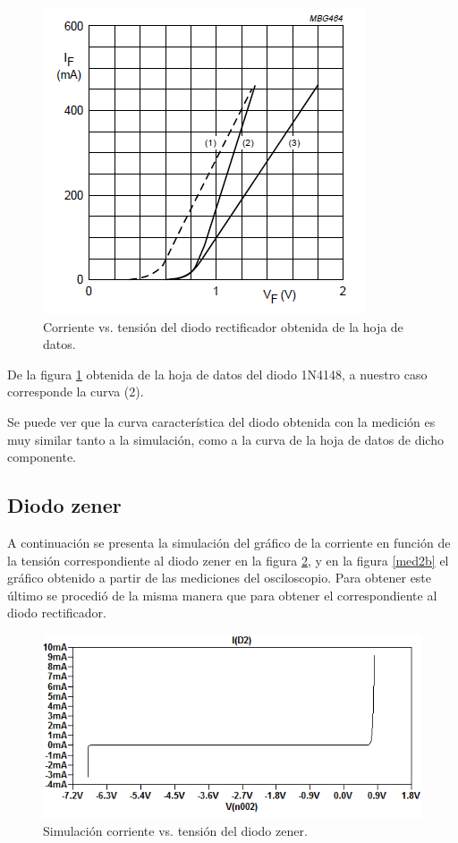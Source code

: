 \begin{figure}[H]
\centering
\includegraphics[scale=0.8]{../EJ1/DiodoRectificador/corrienteDiodoDatasheet}
\caption{Corriente vs. tensi\'on del diodo rectificador obtenida de la hoja de datos.}
\label{med1c}
\end{figure}

De la figura \ref{med1c} obtenida de la hoja de datos del diodo 1N4148, a nuestro caso corresponde la curva (2).

Se puede ver que la curva caracter\'istica del diodo obtenida con la medici\'on es muy similar tanto a la simulaci\'on, como a la curva de la hoja de datos de dicho componente.

\subsection*{\color{orange}Diodo zener}

A continuaci\'on se presenta la simulaci\'on del gr\'afico de la corriente en funci\'on de la tensi\'on correspondiente al diodo zener en la figura \ref{med2a}, y en la figura \ref{med2b} el gr\'afico obtenido a partir de las mediciones del osciloscopio. Para obtener este \'ultimo se procedi\'o de la misma manera que para obtener el correspondiente al diodo rectificador.

\begin{figure}[H]
\centering
\includegraphics[scale=0.8]{../EJ1/DiodoZener/simulacionZener}
\caption{Simulaci\'on corriente vs. tensi\'on del diodo zener.}
\label{med2a}
\end{figure}

